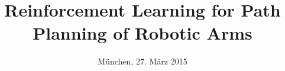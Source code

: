 %
% 
% 
%






\renewcommand{\PersonTitel}{}
\newcommand{\Datum}{\today}

\renewcommand{\PraesentationFusszeileZusatz}{| RL for Robotic Arms}
\title{Reinforcement Learning for Path Planning of
	Robotic Arms}
\author{\PersonTitel{} \PersonVorname{} \PersonNachname}
\institute[]{\UniversitaetName \\ \FakultaetName \\ \LehrstuhlName}
\date[\Datum]{München, 27. März 2015}
\subject{Reinforcement Learning for Path Planning of
	Robotic Arms}




\PraesentationMasterStandard

\PraesentationTitelseite %


%



